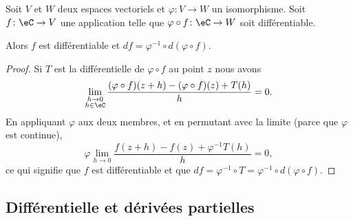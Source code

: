 \begin{proposition}     \label{PropEKLTooSvZjdW}
    Soit \( V\) et \( W\) deux espaces vectoriels et \( \varphi\colon V\to W\) un isomorphisme. Soit \( f\colon \eC\to V\) une application telle que \(\varphi\circ f\colon \eC\to W\) soit différentiable.

    Alors \( f\) est différentiable et \( df=\varphi^{-1}\circ d(\varphi\circ f)\).
\end{proposition}

\begin{proof}
    Si \( T\) est la différentielle de \( \varphi\circ f\) au point \( z\) nous avons
    \begin{equation}
        \lim_{\substack{h\to 0\\h\in \eC}}\frac{ (\varphi\circ f)(z+h)-(\varphi\circ f)(z)+T(h) }{ h }=0.
    \end{equation}
    En appliquant \( \varphi\) aux deux membres, et en permutant avec la limite (parce que \( \varphi\) est continue),
    \begin{equation}
        \varphi\lim_{h\to 0} \frac{ f(z+h)-f(z)+\varphi^{-1} T(h) }{ h }=0,
    \end{equation}
    ce qui signifie que \( f\) est différentiable et que \( df=\varphi^{-1}\circ T=\varphi^{-1}\circ d(\varphi\circ f)\).
\end{proof}
  
  \subsection{Différentielle et dérivées partielles}

